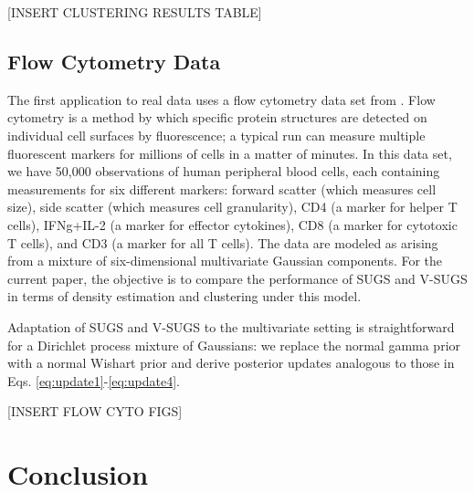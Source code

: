 \documentclass{uwstat572}
\begin{document}
[INSERT CLUSTERING RESULTS TABLE]

\subsection{Flow Cytometry Data}

The first application to real data uses a flow cytometry data set from \cite{manolopoulou}. Flow cytometry is a method by which specific protein structures are detected on individual cell surfaces by fluorescence; a typical run can measure multiple fluorescent markers for millions of cells in a matter of minutes. In this data set, we have 50,000 observations of human peripheral blood cells, each containing measurements for six different markers: forward scatter (which measures cell size), side scatter (which measures cell granularity), CD4 (a marker for helper T cells), IFNg+IL-2 (a marker for effector cytokines), CD8 (a marker for cytotoxic T cells), and CD3 (a marker for all T cells). The data are modeled as arising from a mixture of six-dimensional multivariate Gaussian components. For the current paper, the objective is to compare the performance of SUGS and V-SUGS in terms of density estimation and clustering under this model.

Adaptation of SUGS and V-SUGS to the multivariate setting is straightforward for a Dirichlet process mixture of Gaussians: we replace the normal gamma prior with a normal Wishart prior and derive posterior updates analogous to those in Eqs. \eqref{eq:update1}-\eqref{eq:update4}. 

[INSERT FLOW CYTO FIGS]

\section{Conclusion}
\end{document}

